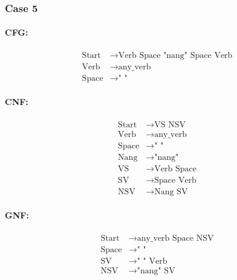 \subsubsection{Case 5}

\paragraph{CFG:}

\begin{equation*}
    \begin{aligned}
        \text{Start} & \rightarrow \text{Verb Space "nang" Space Verb} \\
        \text{Verb}  & \rightarrow \text{any\_verb}                    \\
        \text{Space} & \rightarrow \text{" "}
    \end{aligned}
\end{equation*}

\paragraph{CNF:}

\begin{equation*}
    \begin{aligned}
        \text{Start} & \rightarrow \text{VS NSV}     \\
        \text{Verb}  & \rightarrow \text{any\_verb}  \\
        \text{Space} & \rightarrow \text{" "}        \\
        \text{Nang}  & \rightarrow \text{"nang"}     \\
        \text{VS}    & \rightarrow \text{Verb Space} \\
        \text{SV}    & \rightarrow \text{Space Verb} \\
        \text{NSV}   & \rightarrow \text{Nang SV}
    \end{aligned}
\end{equation*}

\paragraph{GNF:}

\begin{equation*}
    \begin{aligned}
        \text{Start} & \rightarrow \text{any\_verb Space NSV} \\
        \text{Space} & \rightarrow \text{" "}                 \\
        \text{SV}    & \rightarrow \text{" " Verb}            \\
        \text{NSV}   & \rightarrow \text{"nang" SV}
    \end{aligned}
\end{equation*}

